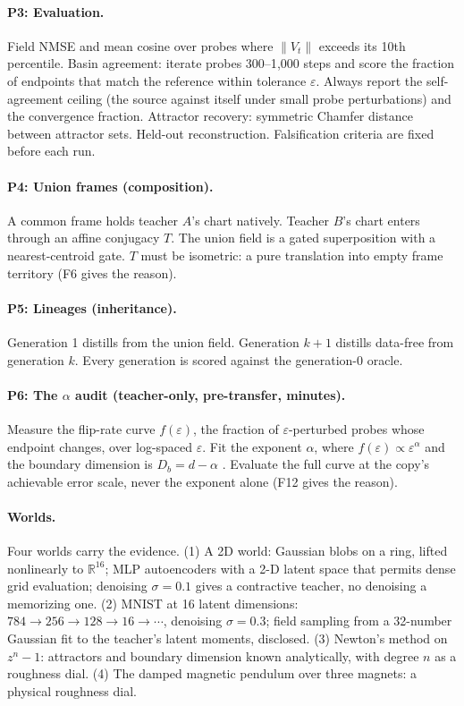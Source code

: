 \documentclass[11pt]{article}
\newcommand{\Vfield}{V}
\begin{document}
\paragraph{P3: Evaluation.} Field NMSE and mean cosine over probes where $\|\Vfield_t\|$ exceeds its 10th percentile. Basin agreement: iterate probes 300--1{,}000 steps and score the fraction of endpoints that match the reference within tolerance $\varepsilon$. Always report the self-agreement ceiling (the source against itself under small probe perturbations) and the convergence fraction. Attractor recovery: symmetric Chamfer distance between attractor sets. Held-out reconstruction. Falsification criteria are fixed before each run.

\paragraph{P4: Union frames (composition).} A common frame holds teacher $A$'s chart natively. Teacher $B$'s chart enters through an affine conjugacy $T$. The union field is a gated superposition with a nearest-centroid gate. $T$ must be isometric: a pure translation into empty frame territory (F6 gives the reason).

\paragraph{P5: Lineages (inheritance).} Generation 1 distills from the union field. Generation $k{+}1$ distills data-free from generation $k$. Every generation is scored against the generation-0 oracle.

\paragraph{P6: The $\alpha$ audit (teacher-only, pre-transfer, minutes).} Measure the flip-rate curve $f(\varepsilon)$, the fraction of $\varepsilon$-perturbed probes whose endpoint changes, over log-spaced $\varepsilon$. Fit the exponent $\alpha$, where $f(\varepsilon) \propto \varepsilon^{\alpha}$ and the boundary dimension is $D_b = d - \alpha$ \citep{grebogi1983,mcdonald1985}. Evaluate the full curve at the copy's achievable error scale, never the exponent alone (F12 gives the reason).

\paragraph{Worlds.} Four worlds carry the evidence. (1) A 2D world: Gaussian blobs on a ring, lifted nonlinearly to $\mathbb{R}^{16}$; MLP autoencoders with a 2-D latent space that permits dense grid evaluation; denoising $\sigma = 0.1$ gives a contractive teacher, no denoising a memorizing one. (2) MNIST at 16 latent dimensions: $784 \to 256 \to 128 \to 16 \to \cdots$, denoising $\sigma = 0.3$; field sampling from a 32-number Gaussian fit to the teacher's latent moments, disclosed. (3) Newton's method on $z^n - 1$: attractors and boundary dimension known analytically, with degree $n$ as a roughness dial. (4) The damped magnetic pendulum over three magnets: a physical roughness dial.
\end{document}
